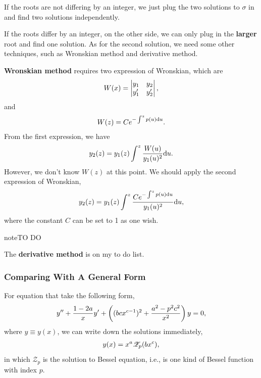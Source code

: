 \documentclass[letterpaper,10pt,english]{sphinxmanual}
\begin{document}
If the roots are not differing by an integer, we just plug the two solutions to \(\sigma\) in and find two solutions independently.

If the roots differ by an integer, on the other side, we can only plug in the \textbf{larger} root and find one solution. As for the second solution, we need some other techniques, such as Wronskian method and derivative method.

\textbf{Wronskian method} requires two expression of Wronskian, which are
\begin{gather}
\begin{split}W(x) = \begin{vmatrix} y_1 & y_2 \\ y_1' & y_2' \end{vmatrix} ,\end{split}\notag
\end{gather}
and
\begin{gather}
\begin{split}W(z) = C e^{-\int^z p(u) \mathrm du}.\end{split}\notag
\end{gather}
From the first expression, we have
\begin{gather}
\begin{split}y_2(z) = y_1(z) \int^z \frac{W(u)}{y_1(u)^2} \mathrm d u.\end{split}\notag
\end{gather}
However, we don't know \(W(z)\) at this point. We should apply the second expression of Wronskian,
\begin{gather}
\begin{split}y_2(z) = y_1(z) \int^z \frac{C e^{-\int^z p(u) \mathrm du}}{y_1(u)^2} \mathrm d u,\end{split}\notag
\end{gather}
where the constant \(C\) can be set to 1 as one wish.

\begin{notice}{note}{TO DO}

The \textbf{derivative method} is on my to do list.
\end{notice}


\subsubsection{Comparing With A General Form}
\label{equation-solving:comparing-with-a-general-form}
For equation that take the following form,
\begin{gather}
\begin{split}y'' + \frac{1 - 2a}{x} y' + \left( (b c x^{c-1})^2 + \frac{a^2 - p^2 c^2}{x^2} \right) y = 0,\end{split}\notag
\end{gather}
where \(y\equiv y(x)\), we can write down the solutions immediately,
\begin{gather}
\begin{split}y(x) = x^a \mathscr {Z}_p (b x^c),\end{split}\notag
\end{gather}
in which \(\mathscr {Z}_p\) is the solution to Bessel equation, i.e., is one kind of Bessel function with index \(p\).
\end{document}
